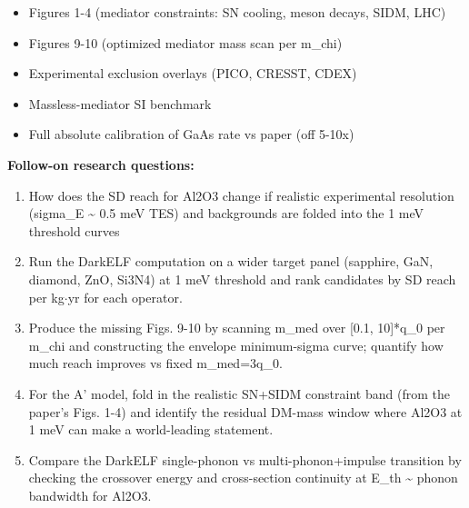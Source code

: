 \begin{itemize}[leftmargin=1.4em,itemsep=0.2em,topsep=0.2em]
\item Figures 1-4 (mediator constraints: SN cooling, meson decays, SIDM, LHC)
\item Figures 9-10 (optimized mediator mass scan per m\_chi)
\item Experimental exclusion overlays (PICO, CRESST, CDEX)
\item Massless-mediator SI benchmark
\item Full absolute calibration of GaAs rate vs paper (off 5-10x)
\end{itemize}\noindent\textbf{Follow-on research questions:}
\begin{enumerate}[leftmargin=1.6em,itemsep=0.2em,topsep=0.2em,label=Q\arabic*.]
\item How does the SD reach for Al2O3 change if realistic experimental resolution (sigma\_E \textasciitilde{} 0.5 meV TES) and backgrounds are folded into the 1 meV threshold curves
\item Run the DarkELF computation on a wider target panel (sapphire, GaN, diamond, ZnO, Si3N4) at 1 meV threshold and rank candidates by SD reach per kg$\cdot$yr for each operator.
\item Produce the missing Figs. 9-10 by scanning m\_med over [0.1, 10]*q\_0 per m\_chi and constructing the envelope minimum-sigma curve; quantify how much reach improves vs fixed m\_med=3q\_0.
\item For the A' model, fold in the realistic SN+SIDM constraint band (from the paper's Figs. 1-4) and identify the residual DM-mass window where Al2O3 at 1 meV can make a world-leading statement.
\item Compare the DarkELF single-phonon vs multi-phonon+impulse transition by checking the crossover energy and cross-section continuity at E\_th \textasciitilde{} phonon bandwidth for Al2O3.
\end{enumerate}

